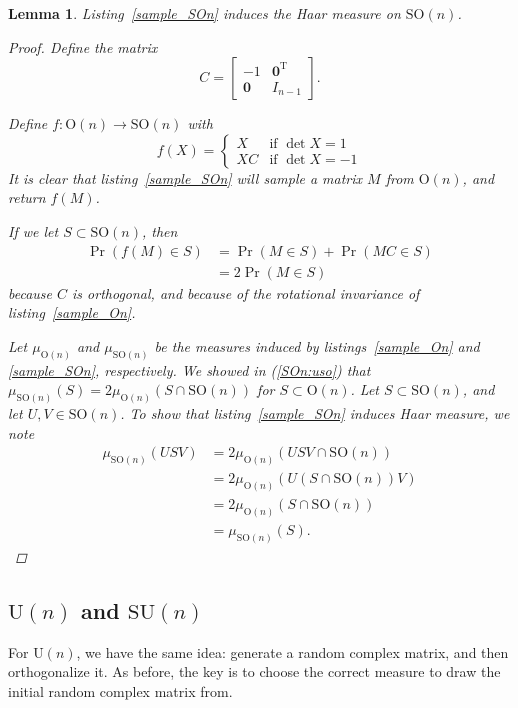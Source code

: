 \documentclass[letterpaper,11pt]{article}
\newtheorem{lemma}{Lemma}
\newcommand{\Tr}{^\text{T}}
\newcommand{\zeros}{\mathbf{0}}
\newcommand{\MG}[2]{{\text{#1}(#2)}}
\newcommand{\Un}{\MG{U}{n}}
\newcommand{\On}{\MG{O}{n}}
\newcommand{\SUn}{\MG{SU}{n}}
\newcommand{\SOn}{\MG{SO}{n}}
\begin{document}
\begin{lemma}
Listing~\ref{sample_SOn} induces the Haar measure on $\SOn$.

\begin{proof}
Define the matrix
\[
  C = \begin{bmatrix}-1 & \zeros\Tr\\ \zeros & I_{n-1} \end{bmatrix}.
\]

Define $f:\On\to\SOn$ with
\[
  f(X) = \left\{
\begin{array}{ll}
  X & \mbox{if }\det{X} = 1\\
 XC & \mbox{if }\det{X} = -1
\end{array}\right.
\]
It is clear that listing~\ref{sample_SOn} will sample a matrix $M$ from $\On$,
  and return $f(M)$.

If we let $S \subset \SOn$, then
\begin{align}\label{SOn:uso}
  \Pr\left(f(M) \in S\right)
  &=\Pr\left(M \in S \right) + \Pr\left( MC \in S \right) \\
  &=2\Pr\left(M \in S \right)
\end{align}
because $C$ is orthogonal, and because of the rotational invariance of
  listing~\ref{sample_On}.

Let $\mu_\On$ and $\mu_\SOn$ be the measures induced by
  listings~\ref{sample_On} and \ref{sample_SOn}, respectively.
We showed in (\ref{SOn:uso}) that $\mu_\SOn(S) = 2\mu_\On(S\cap \SOn)$ for
  $S\subset\On$.
Let $S \subset \SOn$, and let $U,V \in \SOn$.
To show that listing~\ref{sample_SOn} induces Haar measure, we note
\begin{align}
  \mu_\SOn(USV) &= 2 \mu_\On \left( USV\cap\SOn \right)\\
  &= 2 \mu_\On \left(U \left(S \cap \SOn \right) V \right)\\
  &= 2 \mu_\On(S \cap \SOn)\\
  &= \mu_\SOn(S).
\end{align}
\end{proof}
\end{lemma}

\subsection{$\Un$ and $\SUn$}

For $\Un$, we have the same idea: generate a random complex matrix, and then
  orthogonalize it. As before, the key is to choose the correct measure to draw
  the initial random complex matrix from.
\end{document}
